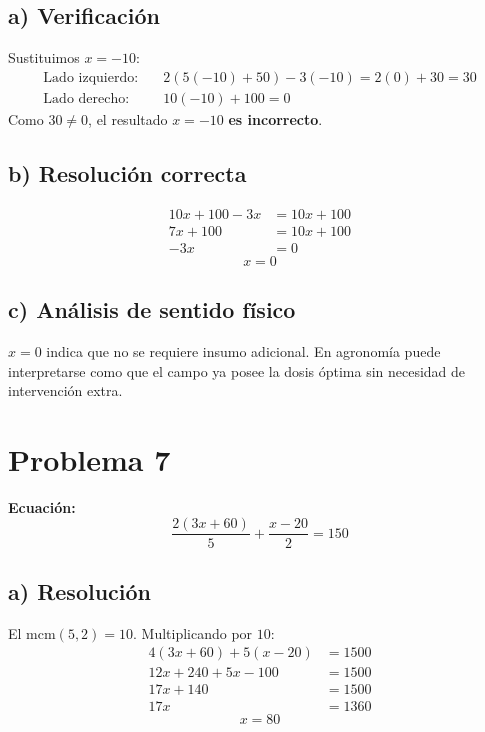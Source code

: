 \documentclass[12pt]{article}
\begin{document}
	\subsection*{a) Verificación}
	
	Sustituimos $x = -10$:
	\begin{align*}
		\text{Lado izquierdo:} &\quad 2(5(-10)+50)-3(-10) = 2(0)+30 = 30 \\
		\text{Lado derecho:}   &\quad 10(-10)+100 = 0
	\end{align*}
	Como $30 \neq 0$, el resultado $x = -10$ \textbf{es incorrecto}.
	
	\subsection*{b) Resolución correcta}
	
	\begin{align*}
		10x + 100 - 3x &= 10x + 100 \\
		7x + 100       &= 10x + 100 \\
		-3x            &= 0
	\end{align*}
	\[
	\boxed{x = 0}
	\]
	
	\subsection*{c) Análisis de sentido físico}
	
	$x = 0$ indica que no se requiere insumo adicional. En agronomía puede
	interpretarse como que el campo ya posee la dosis óptima sin necesidad de
	intervención extra.
	
	\bigskip
	
	\section*{Problema 7}
	
	\textbf{Ecuación:}
	\[
	\frac{2(3x + 60)}{5} + \frac{x - 20}{2} = 150
	\]
	
	\subsection*{a) Resolución}
	
	El $\text{mcm}(5,2) = 10$. Multiplicando por $10$:
	\begin{align*}
		4(3x + 60) + 5(x - 20) &= 1500 \\
		12x + 240 + 5x - 100   &= 1500 \\
		17x + 140              &= 1500 \\
		17x                    &= 1360
	\end{align*}
	\[
	\boxed{x = 80}
	\]
	
\end{document}

